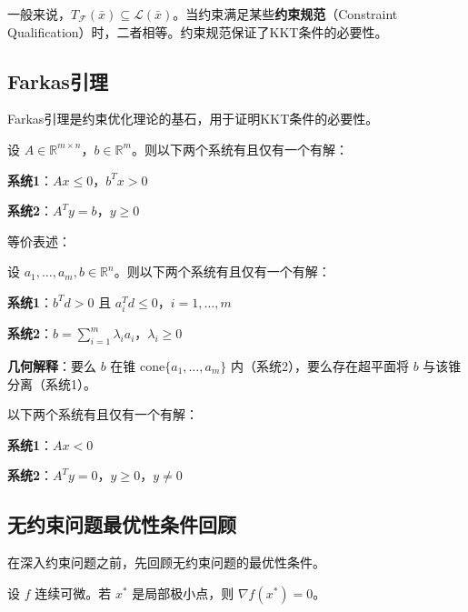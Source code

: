 \begin{notebox}[切锥与LFD的关系]
一般来说，$T_{\mathcal{F}}(\bar{x}) \subseteq \mathcal{L}(\bar{x})$。当约束满足某些\textbf{约束规范}（Constraint Qualification）时，二者相等。约束规范保证了KKT条件的必要性。
\end{notebox}

\subsection{Farkas引理}\label{sec:farkas}

Farkas引理是约束优化理论的基石，用于证明KKT条件的必要性。

\begin{theorem}[Farkas引理]
设 $A \in \mathbb{R}^{m \times n}$，$b \in \mathbb{R}^m$。则以下两个系统有且仅有一个有解：

\textbf{系统1}：$Ax \leq 0$，$b^T x > 0$

\textbf{系统2}：$A^T y = b$，$y \geq 0$
\end{theorem}

等价表述：
\begin{kktbox}
设 $a_1, \ldots, a_m, b \in \mathbb{R}^n$。则以下两个系统有且仅有一个有解：

\textbf{系统1}：$b^T d > 0$ 且 $a_i^T d \leq 0$，$i = 1, \ldots, m$

\textbf{系统2}：$b = \sum_{i=1}^m \lambda_i a_i$，$\lambda_i \geq 0$
\end{kktbox}

\textbf{几何解释}：要么 $b$ 在锥 $\text{cone}\{a_1, \ldots, a_m\}$ 内（系统2），要么存在超平面将 $b$ 与该锥分离（系统1）。

\begin{corollary}[Gordan定理]
以下两个系统有且仅有一个有解：

\textbf{系统1}：$Ax < 0$

\textbf{系统2}：$A^T y = 0$，$y \geq 0$，$y \neq 0$
\end{corollary}

\subsection{无约束问题最优性条件回顾}

在深入约束问题之前，先回顾无约束问题的最优性条件。

\begin{theorem}[无约束一阶必要条件]
设 $f$ 连续可微。若 $x^*$ 是局部极小点，则 $\nabla f(x^*) = 0$。
\end{theorem}

